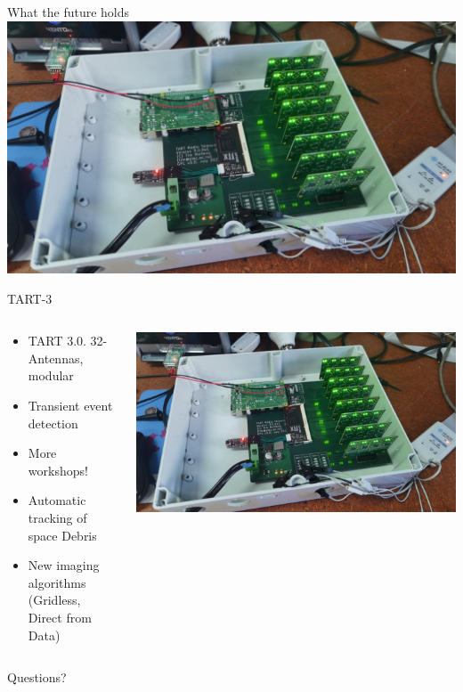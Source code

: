 \documentclass[ignorenonframetext]{beamer}
\begin{document}
\begin{frame}{What the future holds}
    \includegraphics[width=\linewidth]{fig/tart3.jpg}
\end{frame}
\begin{frame}{TART-3}
 \begin{columns}
  \begin{column}{0.6\linewidth}
    \begin{itemize}
    \item TART 3.0. 32-Antennas, modular
    \item Transient event detection
    \item More workshops!
    \item Automatic tracking of space Debris
    \item New imaging algorithms (Gridless, Direct from Data)
    \end{itemize}
  \end{column}
  \begin{column}{0.4\linewidth}
    \includegraphics[width=\linewidth]{fig/tart3.jpg}
  \end{column}
\end{columns}
    \pause
    \begin{block}{}
     \begin{center} Questions? \end{center}
    \end{block}

\end{frame}


\end{document}
